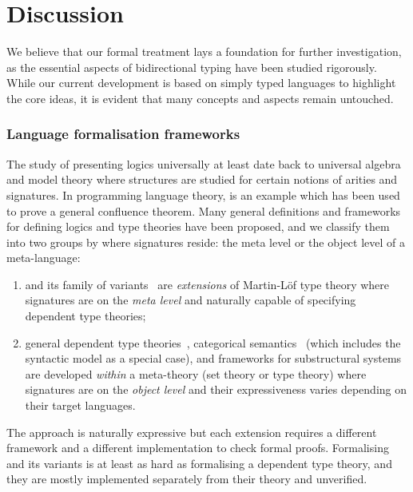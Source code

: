 
\section{Discussion} \label{sec:future}
We believe that our formal treatment lays a foundation for further investigation, as the essential aspects of bidirectional typing have been studied rigorously. 
While our current development is based on simply typed languages to highlight the core ideas, it is evident that many concepts and aspects remain untouched.
\subsubsection{Language formalisation frameworks}

The study of presenting logics universally at least date back to universal algebra and model theory where structures are studied for certain notions of arities and signatures.
In programming language theory,  is an example which has been used to prove a general confluence theorem.
Many general definitions and frameworks for defining logics and type theories have been proposed, and we classify them into two groups by where signatures reside: the meta level or the object level of a meta-language:
\begin{enumerate}
  \item {} and its family of variants~\cite{Harper2007,Assaf2016,Felicissimo2023} are \emph{extensions} of Martin-L\"of type theory where signatures are on the \emph{meta level} and naturally capable of specifying dependent type theories;
\item general dependent type theories~\cite{Bauer2020,Haselwarter2021,Bauer2022a,Uemura2021}, categorical semantics~\cite{Fiore1999,Tanaka2006,Tanaka2006a,Fiore2010,Hamana2011,Fiore2013,Arkor2020,Fiore2022} (which includes the syntactic model as a special case), and frameworks for substructural systems~\cite{Tanaka2006,Tanaka2006a,Wood2022} are developed \emph{within} a meta-theory (set theory or type theory) where signatures are on the \emph{object level} and their expressiveness varies depending on their target languages.
\end{enumerate}

The \LF approach is naturally expressive but each extension requires a different framework and a different implementation to check formal \LF proofs.
Formalising \LF and its variants is at least as hard as formalising a dependent type theory, and they are mostly implemented separately from their theory and unverified.

